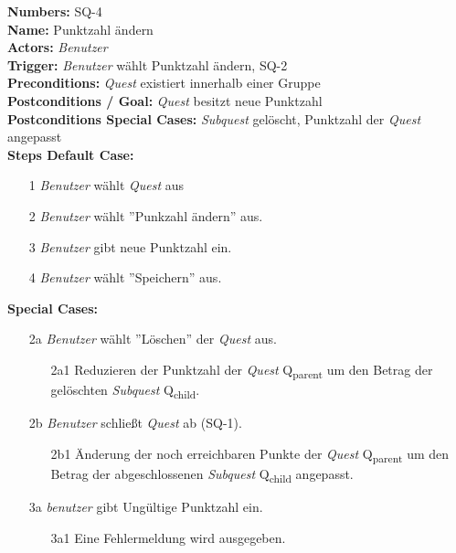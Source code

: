\documentclass{article}
\begin{document}
\newpage

	\begin{samepage}
		\textbf{Numbers:} SQ-4 \\
		\textbf{Name:} Punktzahl ändern\\
		\textbf{Actors:} \textit{Benutzer}\\
		\textbf{Trigger:} \textit{Benutzer} wählt Punktzahl ändern, SQ-2\\ 
		\textbf{Preconditions:} \textit{Quest} existiert innerhalb einer Gruppe\\ 
		\textbf{Postconditions / Goal:} \textit{Quest} besitzt neue Punktzahl\\
		\textbf{Postconditions Special Cases:} \textit{Subquest} gelöscht, Punktzahl der \textit{Quest} angepasst\\
		\textbf{Steps Default Case:}
		\begin{itemize}
			\item[1] \textit{Benutzer} wählt \textit{Quest} aus
			\item[2] \textit{Benutzer} wählt ''Punkzahl ändern'' aus.
			\item[3] \textit{Benutzer} gibt neue Punktzahl ein.
			\item[4] \textit{Benutzer} wählt ''Speichern'' aus. 
		\end{itemize}
		\textbf{Special Cases:}
		\begin{itemize}
		\item [2a] \textit{Benutzer} wählt ''Löschen'' der \textit{Quest} aus.
		\begin{itemize}
			\item [2a1] Reduzieren der Punktzahl der \textit{Quest} Q\textsubscript{parent} um den Betrag der gelöschten \textit{Subquest} Q\textsubscript{child}.
		\end{itemize}   
		\item [2b] \textit{Benutzer} schließt \textit{Quest} ab (SQ-1).
		\begin{itemize}
			\item [2b1] Änderung der noch erreichbaren Punkte der \textit{Quest} Q\textsubscript{parent} um den Betrag der abgeschlossenen \textit{Subquest} Q\textsubscript{child} angepasst.
		\end{itemize}
		\item [3a] \textit{benutzer} gibt Ungültige Punktzahl ein.
		\begin{itemize}
			\item [3a1] Eine Fehlermeldung wird ausgegeben.
		\end{itemize}
		\end{itemize} 
		\end{samepage}
\end{document}

